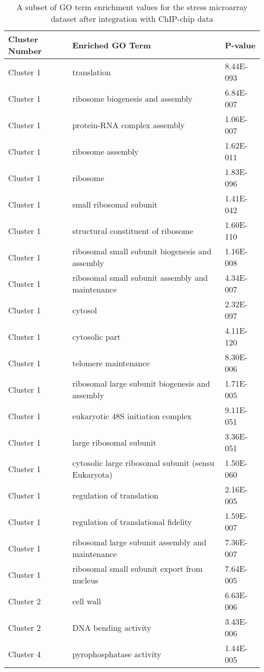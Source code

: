 \begin{table}[p]
\centering
\begin{tabular}{|l|l|l|}
\hline
Cluster Number&Enriched GO Term&P-value\\
\hline
Cluster 1 &	translation                                              &	8.44E-093 \\ \hline
Cluster 1 &	ribosome biogenesis and assembly                         &	6.84E-007 \\ \hline
Cluster 1 &	protein-RNA complex assembly                             &	1.06E-007 \\ \hline
Cluster 1 &	ribosome assembly                                        &	1.62E-011 \\ \hline
Cluster 1 &	ribosome                                                 &	1.83E-096 \\ \hline 
Cluster 1 &	small ribosomal subunit					 &	1.41E-042 \\ \hline
Cluster 1 &	structural constituent of ribosome			 &	1.60E-110 \\ \hline
Cluster 1 &	ribosomal small subunit biogenesis and assembly		 &	1.16E-008 \\ \hline
Cluster 1 &	ribosomal small subunit assembly and maintenance	 &	4.34E-007 \\ \hline
Cluster 1 &	cytosol							 &	2.32E-097 \\ \hline 
Cluster 1 &	cytosolic part						 &	4.11E-120 \\ \hline
Cluster 1 &	telomere maintenance					 &	8.30E-006 \\ \hline
Cluster 1 &	ribosomal large subunit biogenesis and assembly		 &	1.71E-005 \\ \hline
Cluster 1 &	eukaryotic 48S initiation complex			 &	9.11E-051 \\ \hline
Cluster 1 &	large ribosomal subunit					 &	3.36E-051 \\ \hline
Cluster 1 &	cytosolic large ribosomal subunit (sensu Eukaryota)	 &	1.50E-060 \\ \hline
Cluster 1 &	regulation of translation				 &	2.16E-005 \\ \hline
Cluster 1 &	regulation of translational fidelity			 &	1.59E-007 \\ \hline
Cluster 1 &	ribosomal large subunit assembly and maintenance	 &	7.36E-007 \\ \hline
Cluster 1 &	ribosomal small subunit export from nucleus		 &	7.64E-005 \\ \hline
Cluster 2 &	cell wall						 &	6.63E-006 \\ \hline
Cluster 2 &	DNA bending activity					 &	3.43E-006 \\ \hline
Cluster 4 &	pyrophosphatase activity				 &	1.44E-005 \\ 
\hline

\end{tabular}
\caption[A subset of GO term enrichment values for the stress microarray dataset]{A subset of GO term enrichment values for the stress microarray dataset after integration with ChIP-chip data}
\label{tab:stress_chip_0.0001}
\end{table}

